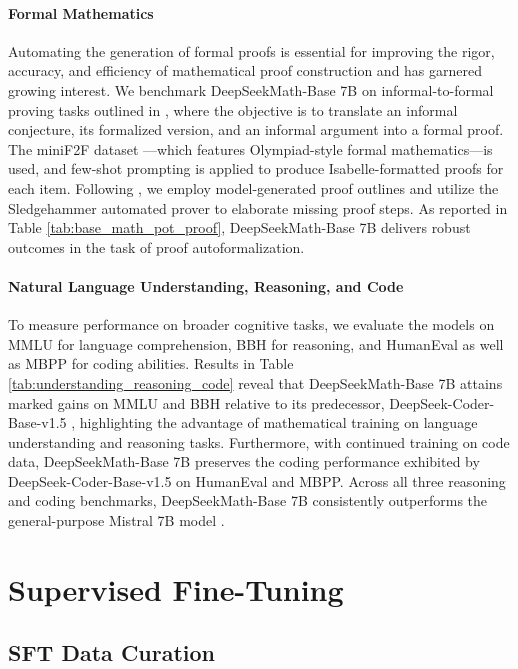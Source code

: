 \paragraph{Formal Mathematics}

Automating the generation of formal proofs is essential for improving the rigor, accuracy, and efficiency of mathematical proof construction and has garnered growing interest. We benchmark DeepSeekMath-Base 7B on informal-to-formal proving tasks outlined in \citep{dsp_proof}, where the objective is to translate an informal conjecture, its formalized version, and an informal argument into a formal proof. The miniF2F dataset \citep{minif2f}—which features Olympiad-style formal mathematics—is used, and few-shot prompting is applied to produce Isabelle-formatted proofs for each item. Following \cite{dsp_proof}, we employ model-generated proof outlines and utilize the Sledgehammer \citep{sledgehammer} automated prover to elaborate missing proof steps. As reported in Table \ref{tab:base_math_pot_proof}, DeepSeekMath-Base 7B delivers robust outcomes in the task of proof autoformalization.

\paragraph{Natural Language Understanding, Reasoning, and Code}

To measure performance on broader cognitive tasks, we evaluate the models on MMLU \citep{mmlu} for language comprehension, BBH \citep{bbh} for reasoning, and HumanEval \citep{codex} as well as MBPP \citep{mbpp} for coding abilities. Results in Table \ref{tab:understanding_reasoning_code} reveal that DeepSeekMath-Base 7B attains marked gains on MMLU and BBH relative to its predecessor, DeepSeek-Coder-Base-v1.5 \citep{deepseek-coder}, highlighting the advantage of mathematical training on language understanding and reasoning tasks. Furthermore, with continued training on code data, DeepSeekMath-Base 7B preserves the coding performance exhibited by DeepSeek-Coder-Base-v1.5 on HumanEval and MBPP. Across all three reasoning and coding benchmarks, DeepSeekMath-Base 7B consistently outperforms the general-purpose Mistral 7B model \citep{mistral}.

\section{Supervised Fine-Tuning}

\subsection{SFT Data Curation}

